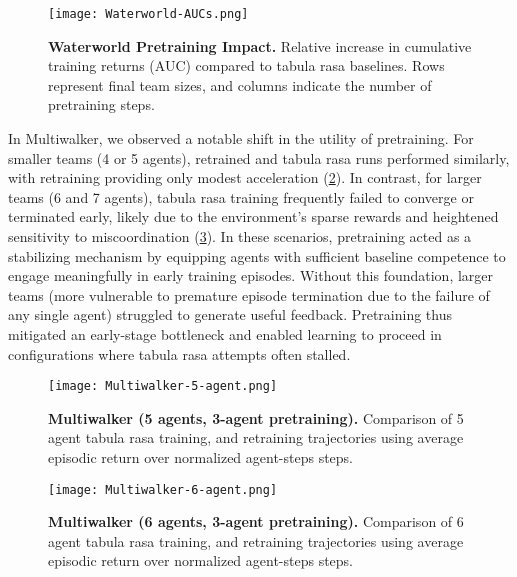 \documentclass{article}
\begin{document}
\begin{figure}[ht]
    \centering
    \texttt{[image: Waterworld-AUCs.png]}
    \caption{\textbf{Waterworld Pretraining Impact.} 
    Relative increase in cumulative training returns (AUC) compared to tabula rasa baselines. 
    Rows represent final team sizes, and columns indicate the number of pretraining steps.}
    \label{con1:fig:waterworld-aucs}
\end{figure}

In Multiwalker, we observed a notable shift in the utility of pretraining. 
For smaller teams (4 or 5 agents), retrained and tabula rasa runs performed similarly, 
with retraining providing only modest acceleration (\cref{con1:fig:multiwalker-5}). 
In contrast, for larger teams (6 and 7 agents), tabula rasa training frequently failed to 
converge or terminated early, likely due to the environment's sparse rewards and heightened 
sensitivity to miscoordination (\cref{con1:fig:multiwalker-6}). 
In these scenarios, pretraining acted as a stabilizing mechanism by equipping agents 
with sufficient baseline competence to engage meaningfully in early training episodes. 
Without this foundation, larger teams (more vulnerable to premature episode termination 
due to the failure of any single agent) struggled to generate useful feedback. 
Pretraining thus mitigated an early-stage bottleneck and enabled learning to proceed 
in configurations where tabula rasa attempts often stalled.

\begin{figure}[!ht]
    \centering
    \texttt{[image: Multiwalker-5-agent.png]}
    \caption{\textbf{Multiwalker (5 agents, 3-agent pretraining).} Comparison of 
    5 agent tabula rasa training, and retraining trajectories using average 
    episodic return over normalized agent-steps steps.}
    \label{con1:fig:multiwalker-5}
\end{figure}

\vspace{2em}

\begin{figure}[!ht]
    \centering
    \texttt{[image: Multiwalker-6-agent.png]}
    \caption{\textbf{Multiwalker (6 agents, 3-agent pretraining).} Comparison of 
    6 agent tabula rasa training, and retraining trajectories using average 
    episodic return over normalized agent-steps steps.}
    \label{con1:fig:multiwalker-6}
\end{figure}
\end{document}
